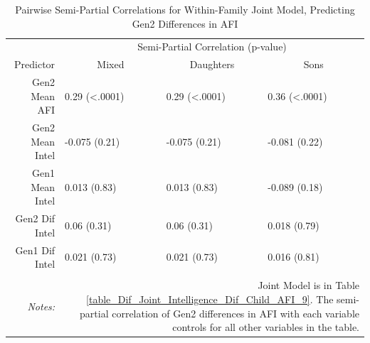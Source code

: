 \documentclass[a4paper,man,apacite,natbib,12pt,longtable,mask]{apa6}\usepackage[]{graphicx}\usepackage[]{color}
\begin{document}
\noindent\begin{minipage}{\textwidth}
\begin{longtable}{@{\extracolsep{5pt}}rlll} \caption{\small Pairwise Semi-Partial Correlations for Within-Family Joint Model, Predicting Gen2 Differences in AFI}\label{table_spcor_wtn}
\hline
&   \multicolumn{3}{c}{Semi-Partial Correlation (p-value)}\\
Predictor &  \multicolumn{1}{c}{Mixed} & \multicolumn{1}{c}{Daughters} & \multicolumn{1}{c}{Sons}\\	
\hline 
Gen2 Mean AFI & 0.29 (<.0001) & 0.29 (<.0001)& 0.36 (<.0001)\\ 
Gen2 Mean Intel & -0.075 (0.21) & -0.075 (0.21)& -0.081 (0.22)\\
Gen1 Mean Intel & 0.013 (0.83) & 0.013 (0.83)& -0.089 (0.18)\\ 
Gen2 Dif Intel & 0.06 (0.31) & 0.06 (0.31)& 0.018 (0.79)\\ 
Gen1 Dif Intel & 0.021 (0.73) & 0.021 (0.73)& 0.016 (0.81)\\ 
\hline\\
\textit{Notes:}  & \multicolumn{3}{r}{\parbox{.6\linewidth}{\footnotesize Joint Model is in Table \ref{table_Dif_Joint_Intelligence_Dif_Child_AFI_9}. The semi-partial correlation of Gen2 differences in AFI with each variable controls for all other variables in the table.}} \\ 
\end{longtable}\end{minipage}\\
\end{document}
